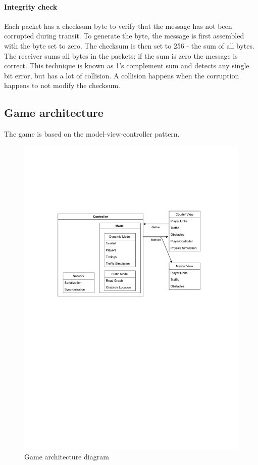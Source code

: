 \documentclass[12pt]{article}
\begin{document}
\paragraph{Integrity check}
Each packet has a checksum byte to verify that the message has not been corrupted during transit. To generate the byte, the message is first assembled with the byte set to zero. The checksum is then set to 256 - the sum of all bytes. The receiver sums all bytes in the packets: if the sum is zero the message is correct. This technique is known as 1's complement sum \cite{checksum} and detects any single bit error, but has a lot of collision. A collision happens when the corruption happens to not modify the checksum.

\clearpage

\subsection{Game architecture}
The game is based on the model-view-controller pattern. \cite{mvc}
\begin{figure}[H]
\includegraphics[width=\textwidth]{game architecture}
\caption{Game architecture diagram}
\label{fig:gamearch}
\end{figure}
\end{document}
